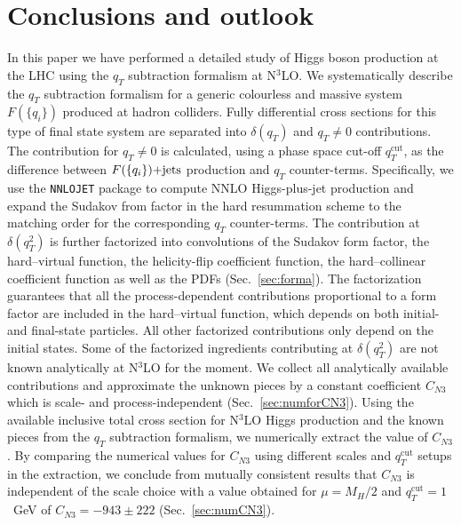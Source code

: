 \documentclass[12pt]{article}
\DeclareRobustCommand{\qt}{q_T}
\DeclareRobustCommand{\qtcut}{\ensuremath{q_T^\mathrm{cut}}}
\begin{document}
\section{Conclusions and outlook}
\label{Sec:conclu}
In this paper we have performed a detailed study of Higgs boson production at the LHC using the $\qt$ subtraction formalism at N$^3$LO. We systematically describe the $\qt$ subtraction formalism for a generic colourless and massive system $F(\{q_i\})$ produced at hadron colliders. Fully differential cross sections for this type of final state system are separated into $\delta(\qt)$ and $\qt\ne 0$ contributions. The contribution for $\qt\ne 0$ is calculated, 
using a phase space cut-off $\qtcut$, as the difference between $F(\{q_i\})\rm{+jets}$ production and $\qt$ counter-terms. Specifically, we use the \texttt{NNLOJET} package to compute NNLO Higgs-plus-jet production and expand the Sudakov from factor in the hard resummation scheme to the matching order for the corresponding $\qt$ counter-terms. The contribution at $\delta(\qt^{2})$ is further factorized into convolutions of the Sudakov form factor, the hard--virtual function, the helicity-flip coefficient function, the hard--collinear coefficient function as well as the PDFs (Sec.~\ref{sec:forma}). The factorization guarantees that all the process-dependent contributions proportional to a form factor are included in the hard--virtual function, which depends on both initial- and final-state particles. All other factorized contributions only depend on the initial states. Some of the factorized ingredients contributing at $\delta(\qt^{2})$ are not known analytically at N$^3$LO for the moment. We collect all analytically available contributions and approximate the unknown pieces by a constant coefficient $C_{N3}$ which is scale- and process-independent (Sec.~\ref{sec:numforCN3}). Using the available inclusive total cross section for N$^3$LO Higgs production and the known pieces from  the $\qt$ subtraction formalism, we numerically extract the value of $C_{N3}$. By comparing the numerical values for $C_{N3}$ using different scales and $\qtcut$ setups in the extraction, we conclude from mutually consistent results that $C_{N3}$ is independent of the scale choice with a value obtained for $\mu=M_H/2$ and $\qtcut = 1$~GeV of $C_{N3}=-943\pm 222$ (Sec.~\ref{sec:numCN3}).
\end{document}
